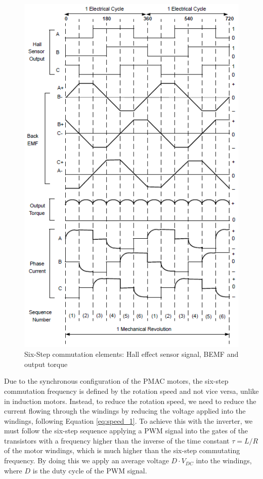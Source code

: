 \begin{figure}[htbp]
\centering
\includegraphics[width=\textwidth]{Images/6step.png} 
\caption[Six Step Commutation]{Six-Step commutation elements: Hall effect sensor signal, BEMF and output torque}
\label{fig:six_step}
\end{figure}

Due to the synchronous configuration of the \ac{PMAC} motors, the six-step commutation frequency is defined by the rotation speed and not vice versa, unlike in induction motors. Instead, to reduce the rotation speed, we need to reduce the current flowing through the windings by reducing the voltage applied into the windings, following Equation \ref{eq:speed_1}. To achieve this with the inverter, we must follow the six-step sequence applying a \ac{PWM} signal into the gates of the transistors with a frequency higher than the inverse of the time constant $\tau = L/R$ of the motor windings, which is much higher than the six-step commutating frequency. By doing this we apply an average voltage $D\cdot V_{DC}$ into the windings, where $D$ is the duty cycle of the \ac{PWM} signal.

